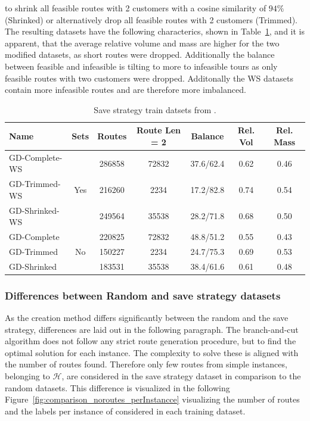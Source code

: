 to shrink all feasible routes with 2 customers with a cosine similarity of $94\%$ (Shrinked) or alternatively drop
all feasible routes with 2 customers (Trimmed).
The resulting datasets have the following characterics, shown in Table~\ref{tab:saved_instances_gendreau}, and it is apparent, that the average relative volume
and mass are higher for the two modified datasets, as short routes were dropped. Additionally the balance between
feasible and infeasible is tilting to more to infeasible tours as only feasible routes with two customers were dropped.
Additonally the WS datasets contain more infeasible routes and are therefore more imbalanced.

\begin{table}[!h]
    \centering
    \small
    \begin{tabular}{l c c c c c c }
        \toprule
        Name           & Sets                 & Routes & Route Len = 2 & Balance   & Rel. Vol & Rel. Mass \\
        \midrule
        GD-Complete-WS & \multirow{3}{*}{Yes} & 286858 & 72832         & 37.6/62.4 & 0.62     & 0.46      \\
        GD-Trimmed-WS  &                      & 216260 & 2234          & 17.2/82.8 & 0.74     & 0.54      \\
        GD-Shrinked-WS &                      & 249564 & 35538         & 28.2/71.8 & 0.68     & 0.50      \\        \midrule
        GD-Complete    & \multirow{3}{*}{No}  & 220825 & 72832         & 48.8/51.2 & 0.55     & 0.43      \\
        GD-Trimmed     &                      & 150227 & 2234          & 24.7/75.3 & 0.69     & 0.53      \\
        GD-Shrinked    &                      & 183531 & 35538         & 38.4/61.6 & 0.61     & 0.48      \\
        \bottomrule
    \end{tabular}
    \caption[Save strategy train datsets from \gendreauDataSet.]{Save strategy train datsets from \gendreauDataSet.}
    \label{tab:saved_instances_gendreau}
\end{table}

\subsubsection{Differences between Random and save strategy datasets}

As the creation method differs significantly between the random and the save strategy, differences are laid out in
the following paragraph. The branch-and-cut algorithm does not follow any strict route generation procedure, but to
find the optimal solution for each instance. The complexity to solve these is aligned with the number of routes found.
Therefore only few routes from simple instances, belonging to $\mathcal{H}$, are considered in the save strategy dataset
in comparison to the random datasets. This difference is visualized in the following Figure~\ref{fig:comparison_noroutes_perInstancce}
visualizing the number of routes and the labels per instance of \gendreauDataSetText considered in each training dataset.

